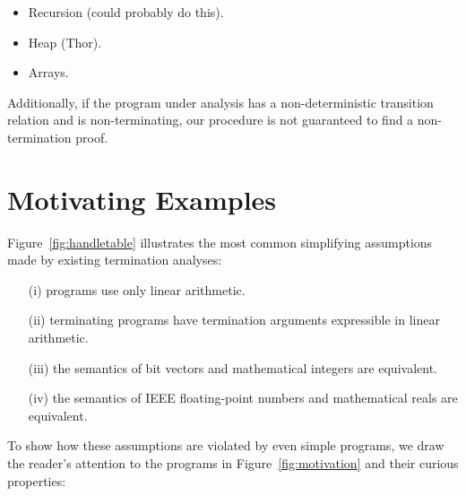 \documentclass[preprint]{sigplanconf}
\theoremstyle{definition}
\begin{document}
\begin{itemize}
\item Recursion (could probably do this).
\item Heap (Thor).
\item Arrays.
\end{itemize}

Additionally, if the program under analysis has a non-deterministic transition relation
and is non-terminating, our procedure is not guaranteed to find a non-termination proof.

\section{Motivating Examples} \label{sec:motivation}

Figure~\ref{fig:handletable} illustrates the most common simplifying
assumptions made by existing termination analyses:
%
\begin{itemize}
\item[(i)] programs use only linear arithmetic.
\item[(ii)] terminating programs have termination arguments expressible in linear arithmetic.
\item[(iii)] the semantics of bit vectors and mathematical integers are equivalent.
\item[(iv)] the semantics of IEEE floating-point numbers and mathematical reals are equivalent.
\end{itemize}  

To show how these assumptions are violated by even simple programs, we draw
the reader's attention to the programs in Figure~\ref{fig:motivation} and
their curious properties:
\end{document}
